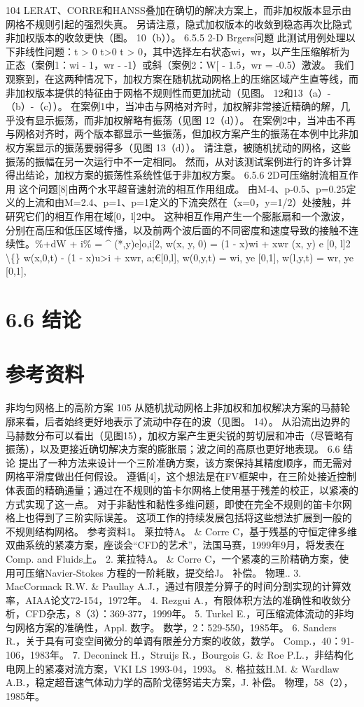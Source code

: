 \documentclass[UTF8,11pt,a4paper,openany,fontset=fandol]{ctexbook}
\begin{document}
104 LERAT、CORRE和HANSS叠加在确切的解决方案上，而非加权版本显示由网格不规则引起的强烈失真。 另请注意，隐式加权版本的收敛到稳态再次比隐式非加权版本的收敛更快（图。 10（b））。 6.5.5 2-D Brgers问题 此测试用例处理以下非线性问题：t > 0 t>0 t > 0，其中选择左右状态wi，wr，以产生压缩解析为正态（案例1：wi - 1，wr - -1）或斜（案例2：W[ - 1.5，wr = -0.5）激波。 我们观察到，在这两种情况下，加权方案在随机扰动网格上的压缩区域产生直等线，而非加权版本提供的特征由于网格不规则性而更加扰动（见图。 12和13（a）-（b）-（c））。 在案例1中，当冲击与网格对齐时，加权解非常接近精确的解，几乎没有显示振荡，而非加权解略有振荡（见图 12（d））。 在案例2中，当冲击不再与网格对齐时，两个版本都显示一些振荡，但加权方案产生的振荡在本例中比非加权方案显示的振荡要弱得多（见图 13（d））。 请注意，被随机扰动的网格，这些振荡的振幅在另一次运行中不一定相同。 然而，从对该测试案例进行的许多计算得出结论，加权方案的振荡性系统性低于非加权方案。 6.5.6 2D可压缩射流相互作用 这个问题[8]由两个水平超音速射流的相互作用组成。 由M-4、p-0.5、p=0.25定义的上流和由M=2.4、p=1、p=1定义的下流突然在（x=0，y=1/2）处接触，并研究它们的相互作用在域[0，l]2中。 这种相互作用产生一个膨胀扇和一个激波，分别在高压和低压区域传播，以及前两个波后面的不同密度和速度导致的接触不连续性。\%+dW + i\% = \textasciicircum{} (*,y)e]o,i[2, w(x, y, 0) = (1 - x)wi + xwr (x, y) e [0, l]2 \textbackslash\{\} w(x,0,t) - (1 - x)u>i + xwr, a;€[0,l], w(0,y,t) = wi, ye [0,1], w(l,y,t) = wr, ye [0,1],

\section{6.6 结论}
\section{参考资料}
非均匀网格上的高阶方案 105 从随机扰动网格上非加权和加权解决方案的马赫轮廓来看，后者始终更好地表示了流动中存在的波（见图。 14）。 从沿流出边界的马赫数分布可以看出（见图15），加权方案产生更尖锐的剪切层和冲击（尽管略有振荡），以及更接近确切解决方案的膨胀扇；波之间的高原也更好地表现。 6.6 结论 提出了一种方法来设计一个三阶准确方案，该方案保持其精度顺序，而无需对网格平滑度做出任何假设。 遵循[4]，这个想法是在FV框架中，在三阶处接近控制体表面的精确通量；通过在不规则的笛卡尔网格上使用基于残差的校正，以紧凑的方式实现了这一点。 对于非黏性和黏性多维问题，即使在完全不规则的笛卡尔网格上也得到了三阶实际误差。 这项工作的持续发展包括将这些想法扩展到一般的不规则结构网格。 参考资料1。 莱拉特A。 \& Corre C，基于残基的守恒定律多维双曲系统的紧凑方案，座谈会“CFD的艺术”，法国马赛，1999年9月，将发表在Comp. and Fluids上。 2. 莱拉特A。 \& Corre C，一个紧凑的三阶精确方案，使用可压缩Navier-Stokes 方程的一阶耗散，提交给J。 补偿。 物理.. 3. MacCormack R.W. \& Paullay A.J.，通过有限差分算子的时间分割实现的计算效率，AIAA论文72-154，1972年。 4. Rezgui A.，有限体积方法的准确性和收敛分析，CFD杂志，8（3）：369-377，1999年。 5. Turkel E.，可压缩流体流动的非均匀网格方案的准确性，Appl. 数字。 数学，2：529-550，1985年。 6. Sanders R.，关于具有可变空间微分的单调有限差分方案的收敛，数学。 Comp.，40：91-106，1983年。 7. Deconinck H.，Struijs R.，Bourgois G. \& Roe P.L.，非结构化电网上的紧凑对流方案，VKI LS 1993-04，1993。 8. 格拉兹H.M. \& Wardlaw A.B.，稳定超音速气体动力学的高阶戈德努诺夫方案，J. 补偿。 物理，58（2），1985年。
\end{document}
